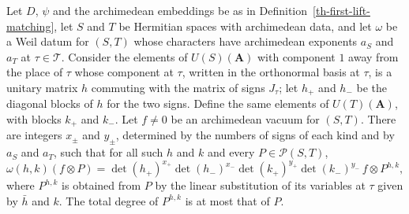 \begin{lemma}\label{th-first-lift-compact}
Let $D$, $\psi$ and the archimedean embeddings be as in
Definition~\ref{th-first-lift-matching}, let $S$ and $T$ be Hermitian spaces
with archimedean data, and let $\omega$ be a Weil datum for $(S,T)$ whose
characters have archimedean exponents $a_S$ and $a_T$ at $\tau\in\mathcal T$.
Consider the elements of $U(S)(\mathbf A)$ with component $1$ away from the
place of $\tau$ whose component at $\tau$, written in the orthonormal basis at
$\tau$, is a unitary matrix $h$ commuting with the matrix of signs $J_\tau$;
let $h_+$ and $h_-$ be the diagonal blocks of $h$ for the two signs. Define the
same elements of $U(T)(\mathbf A)$, with blocks $k_+$ and $k_-$. Let $f\neq0$ be
an archimedean vacuum for $(S,T)$. There are integers $x_\pm$ and $y_\pm$,
determined by the numbers of signs of each kind and by $a_S$ and $a_T$, such
that for all such $h$ and $k$ and every $P\in\mathcal P(S,T)$,
\[
\omega(h,k)(f\otimes P)=\det(h_+)^{x_+}\det(h_-)^{x_-}\det(k_+)^{y_+}\det(k_-)^{y_-}\,f\otimes P^{h,k},
\]
where $P^{h,k}$ is obtained from $P$ by the linear substitution of its variables
at $\tau$ given by $\bar h$ and $k$. The total degree of $P^{h,k}$ is at most
that of $P$.
\end{lemma}

